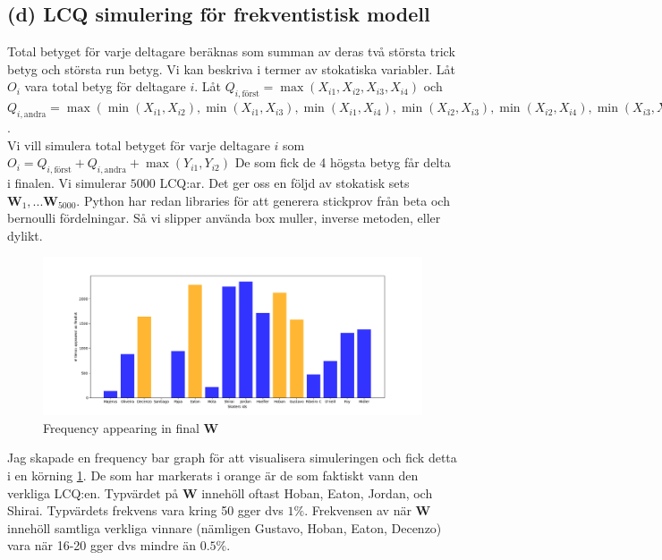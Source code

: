 \documentclass{assignment}
\begin{document}
\subsection*{(d) LCQ simulering för frekventistisk modell}
Total betyget för varje deltagare beräknas som summan av deras två största trick betyg och största run betyg. Vi
kan beskriva i termer av stokatiska variabler. Låt $O_i$ vara total betyg för deltagare $i$.
Låt $Q_{i,\text{först}}=\max(X_{i1},X_{i2},X_{i3},X_{i4})$ och 
\\$Q_{i,\text{andra}}=\max(\min(X_{i1}, X_{i2}), \min(X_{i1}, X_{i3}), \min(X_{i1}, X_{i4}), \min(X_{i2}, X_{i3}), \min(X_{i2}, X_{i4}), \min(X_{i3}, X_{i4}))$.
\\Vi vill simulera total betyget för varje deltagare $i$ som $O_i=Q_{i,\text{först}}+Q_{i,\text{andra}}+\max(Y_{i1},Y_{i2})$
De som fick de 4 högsta betyg får delta i finalen. Vi simulerar $5000$ LCQ:ar. Det ger oss en följd av stokatisk sets $\mathbf{W}_1,...\mathbf{W}_{5000}$.
Python har redan libraries för att generera stickprov från beta och bernoulli fördelningar. Så vi slipper 
använda box muller, inverse metoden, eller dylikt. 
\begin{figure}
    \caption{Frequency appearing in final $\mathbf{W}$}
    \begin{center}
        \includegraphics[width = 200mm]{assets/freq_bar_graph.png} 
    \end{center}
    \label{Histogram 2}
\end{figure}
Jag skapade en frequency bar graph för att visualisera simuleringen och fick detta i en körning \cref{Histogram 2}.
De som har markerats i orange är de som faktiskt vann den verkliga LCQ:en.
Typvärdet på $\mathbf{W}$ innehöll oftast Hoban, Eaton, Jordan, och Shirai. Typvärdets frekvens vara kring 50 gger dvs $1\%$. 
Frekvensen av när $\mathbf{W}$ innehöll samtliga verkliga vinnare (nämligen Gustavo, Hoban, Eaton, Decenzo) vara när 16-20 gger dvs mindre än $0.5\%$.  
\end{document}
